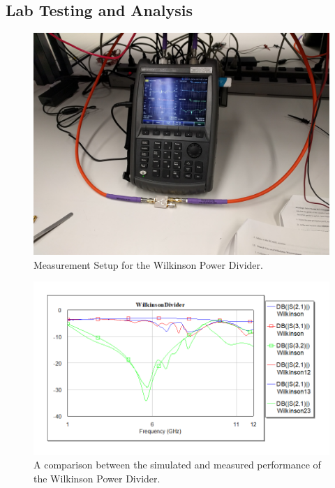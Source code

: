 \documentclass[twocolumn, aps, apl]{revtex4-1}
\begin{document}
\subsection{Lab Testing and Analysis}

\begin{figure}[!htbp]
    \centering
    \includegraphics[scale=0.05]{WilkinsonImg.jpg}
    \caption{Measurement Setup for the Wilkinson Power Divider.}
    \label{fig:wilkinsonimg}
\end{figure}


\begin{figure}[!htbp]
    \centering
    \includegraphics[scale=0.5]{WilkinsonCircuit.png}
    \caption{A comparison between the simulated and measured performance of the Wilkinson Power Divider.}
    \label{fig:wilkinsonmag}
\end{figure}

\FloatBarrier
\end{document}
